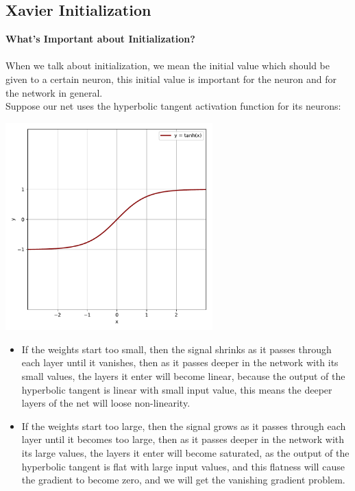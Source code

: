 \documentclass[12pt]{article}
\begin{document}
\subsection{\textbf{Xavier Initialization} \cite{DBLP:journals/jmlr/GlorotB10}}
\textbf{What's Important about Initialization?}\\\\
When we talk about initialization, we mean the initial value which should be given to a certain neuron, this initial value is important for the neuron and for the network in general.\\
Suppose our net uses the hyperbolic tangent activation function for its neurons:\\
\begin{center}
	\includegraphics[width=0.6\textwidth]{tanh}\\[1cm]
\end{center}
\begin{itemize}
	\item If the weights start too small, then the signal shrinks as it passes through each layer until it vanishes, then as it passes deeper in the network with its small values, the layers it enter will become linear, because the output of the hyperbolic tangent is linear with small input value, this means the deeper layers of the net will loose non-linearity.
	\item If the weights start too large, then the signal grows as it passes through each layer until it becomes too large, then as it passes deeper in the network with its large values, the layers it enter will become saturated, as the output of the hyperbolic tangent is flat with large input values, and this flatness will cause the gradient to become zero, and we will get the vanishing gradient problem.
\end{itemize}
\end{document}
